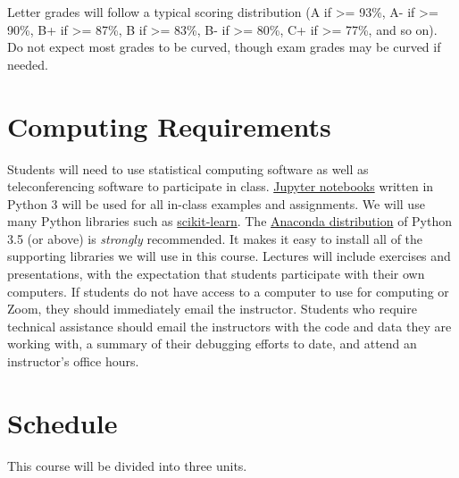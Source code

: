 \documentclass[10pt]{memoir}
\begin{document}
Letter grades will follow a typical scoring distribution (A if >= 93\%, A- if >= 90\%, B+ if >=
87\%, B if >= 83\%, B- if >= 80\%, C+ if >= 77\%, and so on). Do not expect most grades to be
curved, though exam grades may be curved if needed.



\section{\textbf{Computing Requirements}}
Students will need to use statistical computing software as well as teleconferencing software to participate in class. \href{http://jupyter.org/}{Jupyter notebooks} written in Python 3 will be used for all in-class examples and assignments. We will use many Python libraries such as \href{https://scikit-learn.org/}{scikit-learn}. The \href{https://www.continuum.io/why-anaconda}{Anaconda distribution} of Python 3.5 (or above) is \textit{strongly} recommended. It makes it easy to install all of the supporting libraries we will use in this course. Lectures will include exercises and presentations, with the expectation that students participate with their own computers. If students do not have access to a computer to use for computing or Zoom, they should immediately email the instructor. Students who require technical assistance should email the instructors with the code and data they are working with, a summary of their debugging efforts to date, and attend an instructor's office hours.

\clearpage

\section{\textbf{Schedule}}

This course will be divided into three units. \\
\end{document}
